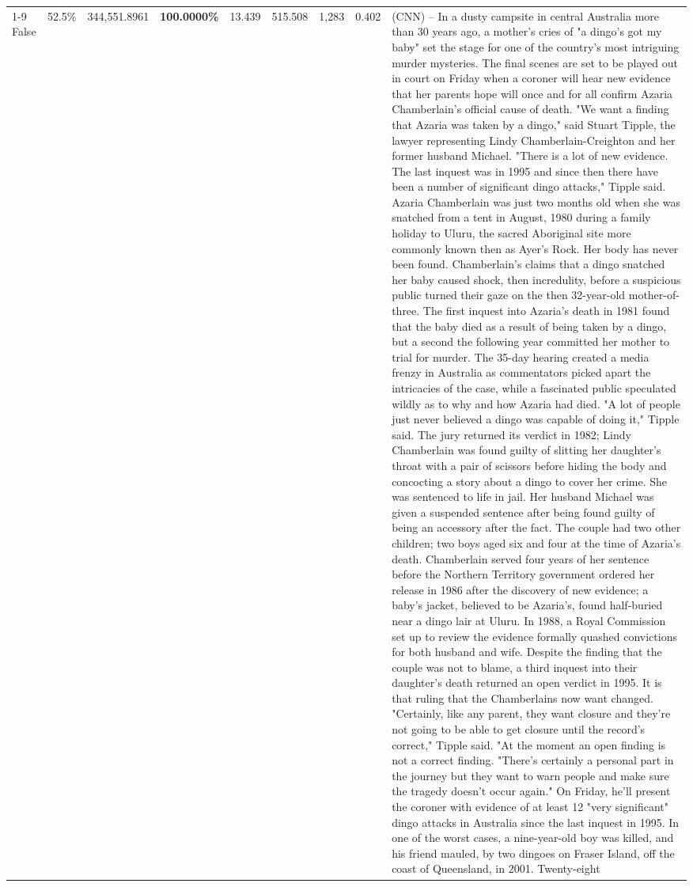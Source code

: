 \begin{table}[H]
\begin{tabular}{lllrlllll}
\cline{1-9}
False & 52.5\% & 344,551.8961 & \bfseries \color{red} 100.0000\% & 13.439 & 515.508 & 1,283 & 0.402 & (CNN) -- In a dusty campsite in central Australia more than 30 years ago, a mother's cries of "a dingo's got my baby" set the stage for one of the country's most intriguing murder mysteries. The final scenes are set to be played out in court on Friday when a coroner will hear new evidence that her parents hope will once and for all confirm Azaria Chamberlain's official cause of death. "We want a finding that Azaria was taken by a dingo," said Stuart Tipple, the lawyer representing Lindy Chamberlain-Creighton and her former husband Michael. "There is a lot of new evidence. The last inquest was in 1995 and since then there have been a number of significant dingo attacks," Tipple said. Azaria Chamberlain was just two months old when she was snatched from a tent in August, 1980 during a family holiday to Uluru, the sacred Aboriginal site more commonly known then as Ayer's Rock. Her body has never been found. Chamberlain's claims that a dingo snatched her baby caused shock, then incredulity, before a suspicious public turned their gaze on the then 32-year-old mother-of-three. The first inquest into Azaria's death in 1981 found that the baby died as a result of being taken by a dingo, but a second the following year committed her mother to trial for murder. The 35-day hearing created a media frenzy in Australia as commentators picked apart the intricacies of the case, while a fascinated public speculated wildly as to why and how Azaria had died. "A lot of people just never believed a dingo was capable of doing it," Tipple said. The jury returned its verdict in 1982; Lindy Chamberlain was found guilty of slitting her daughter's throat with a pair of scissors before hiding the body and concocting a story about a dingo to cover her crime. She was sentenced to life in jail. Her husband Michael was given a suspended sentence after being found guilty of being an accessory after the fact. The couple had two other children; two boys aged six and four at the time of Azaria's death. Chamberlain served four years of her sentence before the Northern Territory government ordered her release in 1986 after the discovery of new evidence; a baby's jacket, believed to be Azaria's, found half-buried near a dingo lair at Uluru. In 1988, a Royal Commission set up to review the evidence formally quashed convictions for both husband and wife. Despite the finding that the couple was not to blame, a third inquest into their daughter's death returned an open verdict in 1995. It is that ruling that the Chamberlains now want changed. "Certainly, like any parent, they want closure and they're not going to be able to get closure until the record's correct," Tipple said. "At the moment an open finding is not a correct finding. "There's certainly a personal part in the journey but they want to warn people and make sure the tragedy doesn't occur again." On Friday, he'll present the coroner with evidence of at least 12 "very significant" dingo attacks in Australia since the last inquest in 1995. In one of the worst cases, a nine-year-old boy was killed, and his friend mauled, by two dingoes on Fraser Island, off the coast of Queensland, in 2001. Twenty-eight 
\end{tabular}
\end{table}
